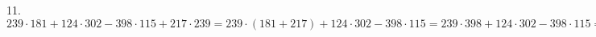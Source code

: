 11. $239\cdot181+124\cdot302-398\cdot115+217\cdot239=239\cdot(181+217)+124\cdot302-398\cdot115=239\cdot398+124\cdot302-398\cdot115=398\cdot(239-115)+124\cdot302=
398\cdot124+124\cdot302=124\cdot(398+302)=124\cdot700=86800.$\\
